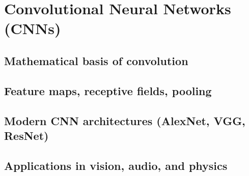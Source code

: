 ﻿\chapter{Convolutional Neural Networks (CNNs)}
\section{Mathematical basis of convolution}

\section{Feature maps, receptive fields, pooling}

\section{Modern CNN architectures (AlexNet, VGG, ResNet)}

\section{Applications in vision, audio, and physics}


